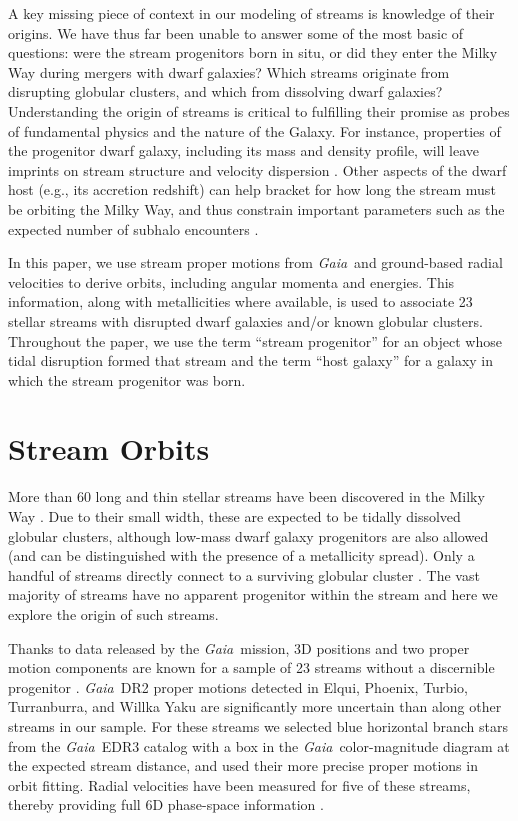 \documentclass[twocolumn]{aastex63}
\newcommand{\gaia}{\textsl{Gaia}}
\begin{document}
A key missing piece of context in our modeling of streams is knowledge of their origins. 
We have thus far been unable to answer some of the most basic of questions: were the stream progenitors born in situ, or did they enter the Milky Way during mergers with dwarf galaxies?
Which streams originate from disrupting globular clusters, and which from dissolving dwarf galaxies?
Understanding the origin of streams is critical to fulfilling their promise as probes of fundamental physics and the nature of the Galaxy.
For instance, properties of the progenitor dwarf galaxy, including its mass and density profile, will leave imprints on stream structure and velocity dispersion \citep[][]{carlberg2018, malhan2020}.
Other aspects of the dwarf host (e.g., its accretion redshift) can help bracket for how long the stream must be orbiting the Milky Way, and thus constrain important parameters such as the expected number of subhalo encounters \citep[e.g.,][]{erkal2016}.

In this paper, we use stream proper motions from \gaia\ and ground-based radial velocities to derive orbits, including angular momenta and energies.
This information, along with metallicities where available, is used to associate 23 stellar streams with disrupted dwarf galaxies and/or known globular clusters.
Throughout the paper, we use the term ``stream progenitor'' for an object whose tidal disruption formed that stream and the term ``host galaxy'' for a galaxy in which the stream progenitor was born.

\section{Stream Orbits}
\label{sec:streamorbits}
More than 60 long and thin stellar streams have been discovered in the Milky Way \citep[see][for an up-to-date catalog]{mateu2018}.
Due to their small width, these are expected to be tidally dissolved globular clusters, although low-mass dwarf galaxy progenitors are also allowed (and can be distinguished with the presence of a metallicity spread).
Only a handful of streams directly connect to a surviving globular cluster \citep[e.g.,][]{rockosi2002, grillmair2006b}.
The vast majority of streams have no apparent progenitor within the stream and here we explore the origin of such streams.

Thanks to data released by the \gaia\ mission, 3D positions and two proper motion components are known for a sample of 23 streams without a discernible progenitor \citep{ibata2019, shipp2019, riley2020}.
\gaia\ DR2 proper motions detected in Elqui, Phoenix, Turbio, Turranburra, and Willka Yaku are significantly more uncertain than along other streams in our sample.
For these streams we selected blue horizontal branch stars from the \gaia\ EDR3 catalog \citep{gaiaedr3} with a box in the \gaia\ color-magnitude diagram at the expected stream distance, and used their more precise proper motions in orbit fitting.
Radial velocities have been measured for five of these streams, thereby providing full 6D phase-space information \citep{caldwell2020, li2020, bonaca2020b}.
\end{document}
